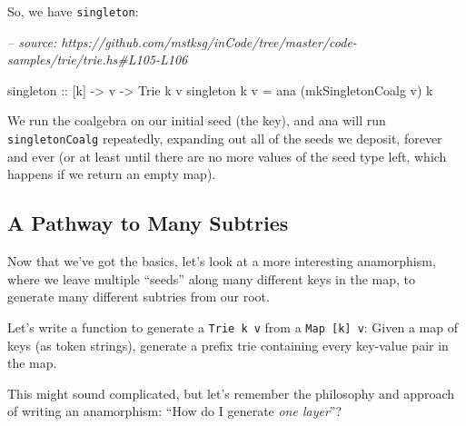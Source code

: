\documentclass[]{article}
\newenvironment{Shaded}{}{}
\newcommand{\CharTok}[1]{\textcolor[rgb]{0.25,0.44,0.63}{#1}}
\newcommand{\CommentTok}[1]{\textcolor[rgb]{0.38,0.63,0.69}{\textit{#1}}}
\newcommand{\DataTypeTok}[1]{\textcolor[rgb]{0.56,0.13,0.00}{#1}}
\newcommand{\DecValTok}[1]{\textcolor[rgb]{0.25,0.63,0.44}{#1}}
\newcommand{\FunctionTok}[1]{\textcolor[rgb]{0.02,0.16,0.49}{#1}}
\newcommand{\NormalTok}[1]{#1}
\newcommand{\OtherTok}[1]{\textcolor[rgb]{0.00,0.44,0.13}{#1}}
\newcommand{\StringTok}[1]{\textcolor[rgb]{0.25,0.44,0.63}{#1}}
\begin{document}
So, we have \texttt{singleton}:

\begin{Shaded}
\begin{Highlighting}[]
\CommentTok{-- source: https://github.com/mstksg/inCode/tree/master/code-samples/trie/trie.hs#L105-L106}

\OtherTok{singleton ::}\NormalTok{ [k] }\OtherTok{->}\NormalTok{ v }\OtherTok{->} \DataTypeTok{Trie}\NormalTok{ k v}
\NormalTok{singleton k v }\FunctionTok{=}\NormalTok{ ana (mkSingletonCoalg v) k}
\end{Highlighting}
\end{Shaded}

We run the coalgebra on our initial seed (the key), and ana will run
\texttt{singletonCoalg} repeatedly, expanding out all of the seeds we deposit,
forever and ever (or at least until there are no more values of the seed type
left, which happens if we return an empty map).

\begin{Shaded}
\end{Shaded}

\hypertarget{a-pathway-to-many-subtries}{%
\subsection{A Pathway to Many Subtries}\label{a-pathway-to-many-subtries}}

Now that we've got the basics, let's look at a more interesting anamorphism,
where we leave multiple ``seeds'' along many different keys in the map, to
generate many different subtries from our root.

Let's write a function to generate a \texttt{Trie\ k\ v} from a
\texttt{Map\ {[}k{]}\ v}: Given a map of keys (as token strings), generate a
prefix trie containing every key-value pair in the map.

This might sound complicated, but let's remember the philosophy and approach of
writing an anamorphism: ``How do I generate \emph{one layer}''?
\end{document}
